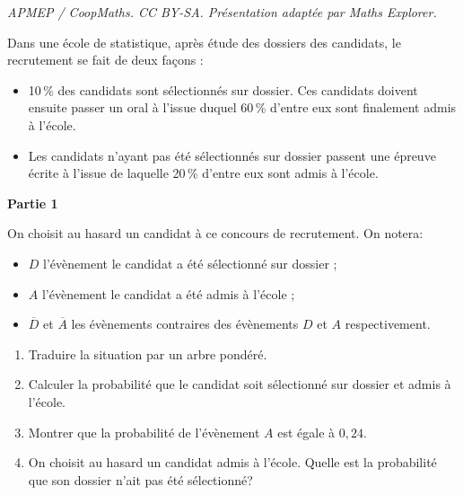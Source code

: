 \documentclass[10pt]{article}
\begin{document}
\noindent\textit{APMEP / CoopMaths. CC BY-SA. Présentation adaptée par Maths Explorer.}\par\medskip
\medskip

Dans une école de statistique, après étude des dossiers des candidats, le recrutement se fait de deux façons :

\setlength\parindent{1cm}
\begin{itemize}
\item[$\bullet~~$] 10\,\% des candidats sont sélectionnés sur dossier. Ces candidats doivent ensuite passer un oral à l'issue duquel 60\,\% d'entre eux sont finalement admis à l'école.
\item[$\bullet~~$] Les candidats n'ayant pas été sélectionnés sur dossier passent une épreuve écrite à l'issue de laquelle 20\,\% d'entre eux sont admis à l'école.
\end{itemize}
\setlength\parindent{0cm}

\bigskip

\textbf{Partie 1}

\medskip

On choisit au hasard un candidat à ce concours de recrutement. On notera:

\setlength\parindent{1cm}
\begin{itemize}
\item[$\bullet~~$] $D$ l'évènement \og le candidat a été sélectionné sur dossier \fg{} ;
\item[$\bullet~~$] $A$ l'évènement \og le candidat a été admis à l'école \fg{} ;
\item[$\bullet~~$] $\overline{D}$ et $\overline{A}$ les évènements contraires des évènements $D$ et $A$ respectivement.
\end{itemize}
\setlength\parindent{0cm}

\medskip

\begin{enumerate}
\item Traduire la situation par un arbre pondéré.
\item Calculer la probabilité que le candidat soit sélectionné sur dossier et admis à l'école.
\item Montrer que la probabilité de l'évènement  $A$ est égale à $0,24$.
\item On choisit au hasard un candidat admis à l'école. Quelle est la probabilité que son dossier n'ait pas été sélectionné?
\end{enumerate}

\bigskip
\end{document}
